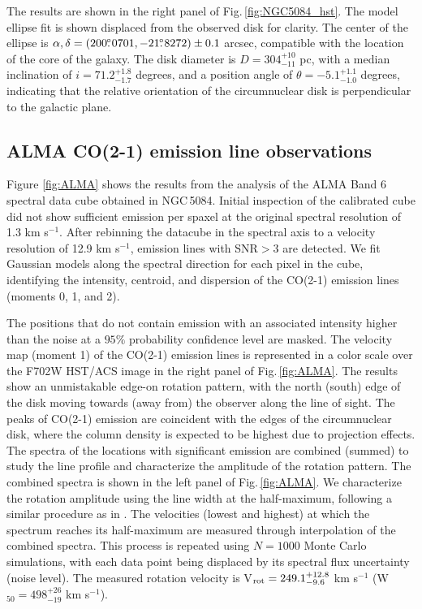 \documentclass[modern]{CORE-AAS/aastex631}
\begin{document}
{The results are shown in the right panel of Fig.\,\ref{fig:NGC5084_hst}. The model ellipse fit is shown displaced from the observed disk for clarity. The center of the ellipse is $\alpha, \delta = (200\mbox{$.\!\!^\circ$}0701, -21\mbox{$.\!\!^\circ$}8272) \pm 0.1$ arcsec, compatible with the location of the core of the galaxy. The disk diameter is  $D=304^{+10}_{-11}$ pc, with a median inclination of $i=71.2^{+1.8}_{-1.7}$ degrees, and a position angle of $\theta = -5.1^{+1.1}_{-1.0}$ degrees, indicating that the relative orientation of the circumnuclear disk is perpendicular to the galactic plane.


\subsection{ALMA CO(2-1) emission line observations}
\label{subsec:results_alma}


Figure \ref{fig:ALMA} shows the results from the analysis of the ALMA Band 6 spectral data cube obtained in NGC\,5084. Initial inspection of the calibrated cube did not show sufficient emission per spaxel at the original spectral resolution of 1.3 km s$^{-1}$. After rebinning the datacube in the spectral axis to a velocity resolution of 12.9 km s$^{-1}$, emission lines with SNR$>3$ are detected. We fit Gaussian models along the spectral direction for each pixel in the cube, identifying the intensity, centroid, and dispersion of the CO(2-1) emission lines (moments 0, 1, and 2). 

The positions that do not contain emission with an associated intensity higher than the noise at a $95\%$ probability confidence level are masked. The velocity map (moment 1) of the CO(2-1) emission lines is represented in a color scale over the F702W HST/ACS image in the right panel of Fig.\,\ref{fig:ALMA}. The results show an unmistakable edge-on rotation pattern, with the north (south) edge of the disk moving towards (away from) the observer along the line of sight. The peaks of CO(2-1) emission are coincident with the edges of the circumnuclear disk, where the column density is expected to be highest due to projection effects.\\ 

The spectra of the locations with significant emission are combined (summed) to study the line profile and characterize the amplitude of the rotation pattern. The combined spectra is shown in the left panel of Fig.\,\ref{fig:ALMA}. We characterize the rotation amplitude using the line width at the half-maximum, following a similar procedure as in \citep[W$_{50}$,][]{smith+2021mnras500_1933}. The velocities (lowest and highest) at which the spectrum reaches its half-maximum are measured through interpolation of the combined spectra. This process is repeated using $N=1000$ Monte Carlo simulations, with each data point being displaced by its spectral flux uncertainty (noise level). The measured rotation velocity is V$_{\rm rot} = 249.1^{+12.8}_{-9.6}$ km s$^{-1}$ (W$_{50}=498^{+26}_{-19}$ km s$^{-1}$).\\

}
\end{document}
